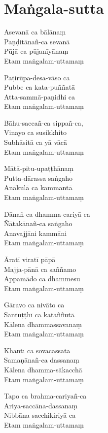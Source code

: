 \clearpage

\chapter{Maṅgala-sutta}%


\begin{paritta}
Asevanā ca bālānaṃ\\
Paṇḍitānañ-ca sevanā\\
Pūjā ca pūjanīyānaṃ\\
Etam maṅgalam-uttamaṃ

Paṭirūpa-desa-vāso ca\\
Pubbe ca kata-puññatā\\
Atta-sammā-paṇidhi ca\\
Etam maṅgalam-uttamaṃ

Bāhu-saccañ-ca sippañ-ca,\\
Vinayo ca susikkhito\\
Subhāsitā ca yā vācā\\
Etam maṅgalam-uttamaṃ

Mātā-pitu-upaṭṭhānaṃ\\
Putta-dārassa saṅgaho\\
Anākulā ca kammantā\\
Etam maṅgalam-uttamaṃ

Dānañ-ca dhamma-cariyā ca\\
Ñātakānañ-ca saṅgaho\\
Anavajjāni kammāni\\
Etam maṅgalam-uttamaṃ

Āratī viratī pāpā\\
Majja-pānā ca saññamo\\
Appamādo ca dhammesu\\
Etam maṅgalam-uttamaṃ

Gāravo ca nivāto ca\\
Santuṭṭhī ca kataññutā\\
Kālena dhammassavanaṃ\\
Etam maṅgalam-uttamaṃ

Khantī ca sovacassatā\\
Samaṇānañ-ca dassanaṃ\\
Kālena dhamma-sākacchā\\
Etam maṅgalam-uttamaṃ

Tapo ca brahma-cariyañ-ca\\
Ariya-saccāna-dassanaṃ\\
Nibbāna-sacchikiriyā ca\\
Etam maṅgalam-uttamaṃ


\end{paritta}
